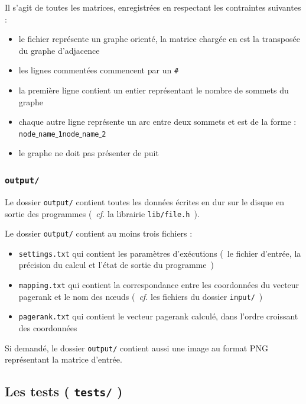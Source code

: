 \documentclass[a4paper,12pt]{article}
\begin{document}
\bigskip

Il s'agit de toutes les matrices, enregistrées en respectant les contraintes suivantes :  
\medskip
\begin{itemize}
  \item le fichier représente un graphe orienté, la matrice chargée en est la transposée du graphe d'adjacence
  \item les lignes commentées commencent par un \texttt{\#}
  \item la première ligne contient un entier représentant le nombre de sommets du graphe
  \item chaque autre ligne représente un arc entre deux sommets et est de la forme : \\ \texttt{node$\_$name$\_$1\textvisiblespace node$\_$name$\_$2}
  \item le graphe ne doit pas présenter de puit
\end{itemize}

\subsubsection{\texttt{output/}}
\label{sec:output}

Le dossier \texttt{output/} contient toutes les données écrites en dur sur le disque en sortie des programmes (~\textit{cf.} la librairie \texttt{lib/file.h}~).

\bigskip

Le dossier \texttt{output/} contient au moins trois fichiers :
\medskip
\begin{itemize}
  \item \texttt{settings.txt} qui contient les paramètres d'exécutions (~le fichier d'entrée, la précision du calcul et l'état de sortie du programme~)
  \item \texttt{mapping.txt} qui contient la correspondance entre les coordonnées du vecteur pagerank et le nom des n\oe{}uds (~\textit{cf.} les fichiers du dossier \texttt{input/}~)
  \item \texttt{pagerank.txt} qui contient le vecteur pagerank calculé, dans l'ordre croissant des coordonnées
\end{itemize}

\bigskip

Si demandé, le dossier \texttt{output/} contient aussi une image au format PNG représentant la matrice d'entrée.

\subsection{Les tests ( \texttt{tests/} )}
\end{document}

